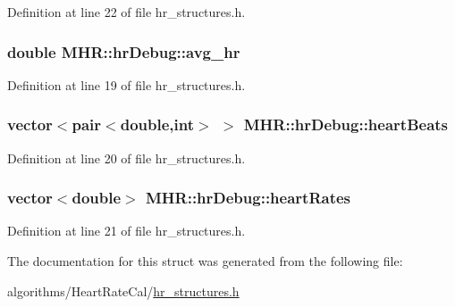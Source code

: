 Definition at line 22 of file hr\+\_\+structures.\+h.

\hypertarget{struct_m_h_r_1_1hr_debug_ab0a19a437cbd96f0af5d1b41114c1b80}{
\subsubsection[{avg\+\_\+hr}]{\setlength{\rightskip}{0pt plus 5cm}double M\+H\+R\+::hr\+Debug\+::avg\+\_\+hr}}\label{struct_m_h_r_1_1hr_debug_ab0a19a437cbd96f0af5d1b41114c1b80}


Definition at line 19 of file hr\+\_\+structures.\+h.

\hypertarget{struct_m_h_r_1_1hr_debug_aecd197b08db2c97469bc1d99af93a559}{
\subsubsection[{heart\+Beats}]{\setlength{\rightskip}{0pt plus 5cm}vector$<$pair$<$double,int$>$ $>$ M\+H\+R\+::hr\+Debug\+::heart\+Beats}}\label{struct_m_h_r_1_1hr_debug_aecd197b08db2c97469bc1d99af93a559}


Definition at line 20 of file hr\+\_\+structures.\+h.

\hypertarget{struct_m_h_r_1_1hr_debug_a019b377c2e1d3ade917074967cf20504}{
\subsubsection[{heart\+Rates}]{\setlength{\rightskip}{0pt plus 5cm}vector$<$double$>$ M\+H\+R\+::hr\+Debug\+::heart\+Rates}}\label{struct_m_h_r_1_1hr_debug_a019b377c2e1d3ade917074967cf20504}


Definition at line 21 of file hr\+\_\+structures.\+h.



The documentation for this struct was generated from the following file\+:\begin{DoxyCompactItemize}
\item 
algorithms/\+Heart\+Rate\+Cal/\hyperlink{hr__structures_8h}{hr\+\_\+structures.\+h}\end{DoxyCompactItemize}
